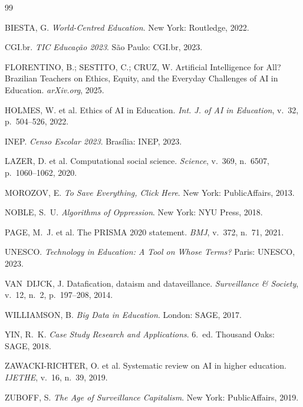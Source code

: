 \documentclass[preprint,12pt,authoryear]{elsarticle}
\begin{document}



\begin{thebibliography}{99}

BIESTA, G. \textit{World-Centred Education}. New York: Routledge, 2022.

CGI.br. \textit{TIC Educação 2023}. São Paulo: CGI.br, 2023.

FLORENTINO, B.; SESTITO, C.; CRUZ, W.
Artificial Intelligence for All? Brazilian Teachers on Ethics, Equity,
and the Everyday Challenges of AI in Education. \textit{arXiv.org}, 2025.

HOLMES, W. et al. Ethics of AI in Education.
\textit{Int. J. of AI in Education}, v.~32, p.~504--526, 2022.

INEP. \textit{Censo Escolar 2023}. Brasília: INEP, 2023.

LAZER, D. et al. Computational social science.
\textit{Science}, v.~369, n.~6507, p.~1060--1062, 2020.

MOROZOV, E. \textit{To Save Everything, Click Here}.
New York: PublicAffairs, 2013.

NOBLE, S.~U. \textit{Algorithms of Oppression}. New York: NYU Press, 2018.

PAGE, M.~J. et al. The PRISMA 2020 statement.
\textit{BMJ}, v.~372, n.~71, 2021.

UNESCO. \textit{Technology in Education: A Tool on Whose Terms?}
Paris: UNESCO, 2023.

VAN~DIJCK, J. Datafication, dataism and dataveillance.
\textit{Surveillance \& Society}, v.~12, n.~2, p.~197--208, 2014.

WILLIAMSON, B. \textit{Big Data in Education}. London: SAGE, 2017.

YIN, R.~K. \textit{Case Study Research and Applications}.
6.~ed. Thousand Oaks: SAGE, 2018.

ZAWACKI-RICHTER, O. et al.
Systematic review on AI in higher education.
\textit{IJETHE}, v.~16, n.~39, 2019.

ZUBOFF, S. \textit{The Age of Surveillance Capitalism}.
New York: PublicAffairs, 2019.

\end{thebibliography}
\end{document}
